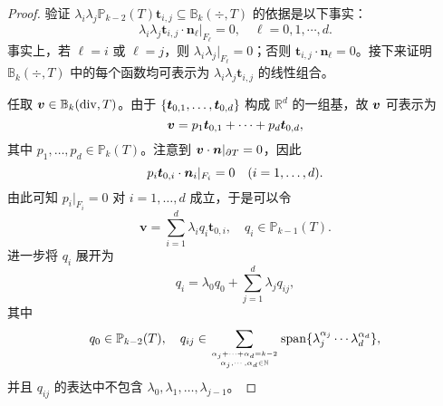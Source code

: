 \begin{proof}
验证 $\lambda_i\lambda_j\mathbb P_{k-2}(T)\boldsymbol t_{i,j}\subseteq \mathbb B_k(\div, T)$ 的依据是以下事实：
$$\lambda_i\lambda_j \boldsymbol t_{i,j}\cdot \boldsymbol n_{\ell}|_{F_{\ell}} = 0, \quad \ell = 0, 1, \cdots, d.$$
事实上，若 $\ell = i$ 或 $\ell = j$，则 $\lambda_i\lambda_j|_{F_{\ell}} =0$；否则 $\boldsymbol t_{i,j}\cdot \boldsymbol n_{\ell} = 0$。接下来证明 $\mathbb B_k(\div, T)$ 中的每个函数均可表示为 $\lambda_i\lambda_j \boldsymbol t_{i,j}$ 的线性组合。


任取 $\boldsymbol v\in\mathbb B_k(\operatorname{div}, T)$。由于 $\{\boldsymbol t_{0,1}, \ldots, \boldsymbol t_{0,d}\}$ 构成 $\mathbb R^d$ 的一组基，故 $\boldsymbol v$ 可表示为
$$\boldsymbol v=p_1\boldsymbol t_{0,1}+\cdots+p_d\boldsymbol t_{0,d},$$ 
其中 $p_1, \ldots, p_d\in\mathbb P_k(T)$。注意到 $\boldsymbol v\cdot\boldsymbol n|_{\partial T}=0$，因此
\[
p_i\boldsymbol t_{0,i}\cdot\boldsymbol n_i|_{F_i}=0 \quad (i=1,\ldots,d).
\]
由此可知 $p_i|_{F_i} = 0$  对 $i=1,\dots,d$ 成立，于是可以令
\[
\boldsymbol v = \sum_{i=1}^{d} \lambda_i q_i \boldsymbol t_{0,i}, \quad q_i\in \mathbb P_{k-1}(T).
\]
进一步将 $q_i$ 展开为
\[
q_i = \lambda_0 q_0 + \sum_{j=1}^{d} \lambda_j q_{ij},
\]
其中
\[
q_0 \in \mathbb P_{k-2}(T), \quad q_{ij} \in \sum_{\alpha_j+\cdots+\alpha_{d}=k-2 \atop \alpha_j,\cdots,\alpha_{d}\in\mathbb N} \mathrm{span}\{\lambda_j^{\alpha_j}\cdots \lambda_d^{\alpha_d}\},
\]
并且 $q_{ij}$ 的表达中不包含 $\lambda_0, \lambda_1, \ldots, \lambda_{j-1}$。


\end{proof}
